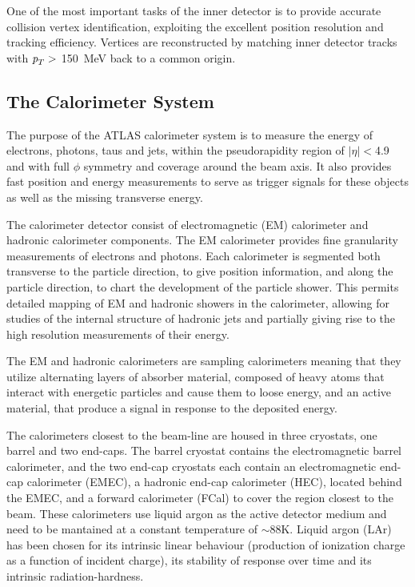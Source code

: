 One of the most important tasks of the inner detector is to provide accurate collision vertex identification, exploiting the excellent position resolution and tracking efficiency. Vertices are reconstructed by matching inner detector tracks with ${\emph{p}_{T}} >$ 150~MeV back to a common origin.%

\subsection{The Calorimeter System}\label{sec:atlasCALO}

The purpose of the ATLAS calorimeter system is to measure the energy of electrons, photons, taus and jets, within the pseudorapidity region of $|\eta| < $4.9 and with full $\phi$ symmetry and coverage around the beam axis. It also provides fast position and energy measurements to serve as trigger signals for these objects as well as the missing transverse energy. 

The calorimeter detector consist of electromagnetic (EM) calorimeter and hadronic calorimeter components. The EM calorimeter provides fine granularity measurements of electrons and photons.  Each calorimeter is segmented both transverse to the particle direction, to give position information, and along the particle direction, to chart the development of the particle shower.  This permits detailed mapping of EM and  hadronic showers in the calorimeter, allowing for studies of the internal structure of hadronic jets and partially giving rise to the high resolution measurements of their energy.

The EM and hadronic calorimeters are sampling calorimeters meaning that they utilize alternating layers of absorber material, composed of heavy atoms that interact with energetic particles and cause them to loose energy, and an active material, that produce a signal in response to the deposited  energy.

The calorimeters closest to the beam-line are housed in three cryostats, one barrel and two end-caps. The barrel cryostat contains the electromagnetic barrel calorimeter, and the two end-cap cryostats each contain an electromagnetic end-cap calorimeter (EMEC), a hadronic end-cap calorimeter (HEC), located behind the EMEC, and a forward calorimeter (FCal) to cover the region closest to the beam.  These calorimeters use liquid argon as the active detector medium and need to be mantained at a constant temperature of $\sim$88K.  Liquid argon (LAr) has been chosen for its intrinsic linear behaviour (production of ionization charge as a function of incident charge), its stability of response over time and its intrinsic radiation-hardness. 

